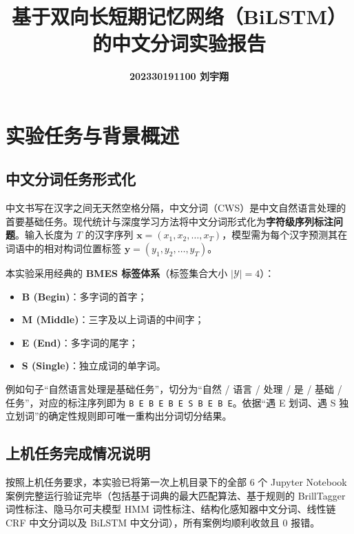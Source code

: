 \documentclass[11pt,a4paper]{ctexart}
\title{\vspace{-1.2cm}\Large\bfseries 基于双向长短期记忆网络（BiLSTM）的中文分词实验报告}
\author{\large \textbf{202330191100 \quad 刘宇翔}}
\date{}
\begin{document}
\maketitle
\vspace{-0.8cm}
\thispagestyle{fancy}

\section{实验任务与背景概述}

\subsection{中文分词任务形式化}

中文书写在汉字之间无天然空格分隔，中文分词（CWS）是中文自然语言处理的首要基础任务。现代统计与深度学习方法将中文分词形式化为\textbf{字符级序列标注问题}。输入长度为 $T$ 的汉字序列 $\boldsymbol{x} = (x_1, x_2, \dots, x_T)$，模型需为每个汉字预测其在词语中的相对构词位置标签 $\boldsymbol{y} = (y_1, y_2, \dots, y_T)$。

本实验采用经典的 \textbf{BMES 标签体系}（标签集合大小 $|\mathcal{Y}| = 4$）：
\begin{itemize}
    \setlength{\itemsep}{0pt}
    \setlength{\parsep}{0pt}
    \setlength{\parskip}{0pt}
    \item \textbf{B (Begin)}：多字词的首字；
    \item \textbf{M (Middle)}：三字及以上词语的中间字；
    \item \textbf{E (End)}：多字词的尾字；
    \item \textbf{S (Single)}：独立成词的单字词。
\end{itemize}

例如句子“自然语言处理是基础任务”，切分为“自然 / 语言 / 处理 / 是 / 基础 / 任务”，对应的标注序列即为 \texttt{B E B E B E S B E B E}。依据“遇 E 划词、遇 S 独立划词”的确定性规则即可唯一重构出分词切分结果。

\subsection{上机任务完成情况说明}

按照上机任务要求，本实验已将第一次上机目录下的全部 6 个 Jupyter Notebook 案例完整运行验证完毕（包括基于词典的最大匹配算法、基于规则的 BrillTagger 词性标注、隐马尔可夫模型 HMM 词性标注、结构化感知器中文分词、线性链 CRF 中文分词以及 BiLSTM 中文分词），所有案例均顺利收敛且 0 报错。
\end{document}
